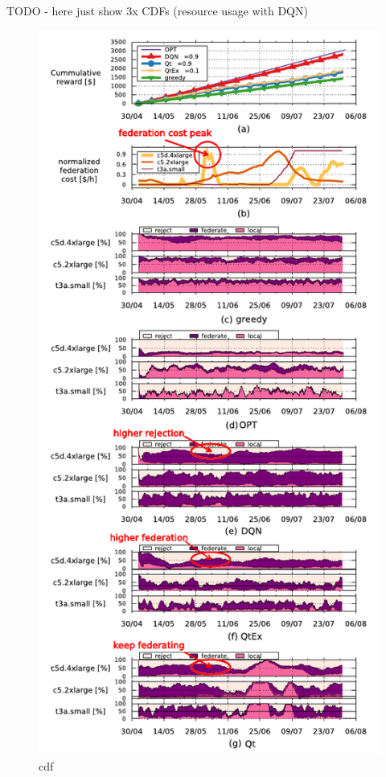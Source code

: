 \documentclass[aspectratio=169]{beamer}
\begin{document}
\begin{frame}
    \frametitle{\secname}
    \framesubtitle{\subsecname}

    TODO - here just show 3x CDFs (resource usage with DQN)
    \begin{figure}
        \centering
        
        \includegraphics[width=.9\textwidth, trim={0 20em 0 0},clip]{img/cdfs-all-decisions_edited.pdf}
        \caption{cdf}
        \label{fig:cdf-dqn}
    \end{figure}
\end{frame}
\end{document}
